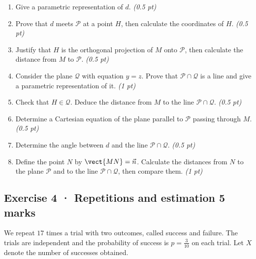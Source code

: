 \begin{enumerate}

\item Give a parametric representation of $d$. \hfill\textit{(0.5 pt)}

\item Prove that $d$ meets $\mathcal P$ at a point $H$, then calculate the coordinates of $H$. \hfill\textit{(0.5 pt)}

\item Justify that $H$ is the orthogonal projection of $M$ onto $\mathcal P$, then calculate the distance from $M$ to $\mathcal P$. \hfill\textit{(0.5 pt)}

\item Consider the plane $\mathcal Q$ with equation $y=z$. Prove that $\mathcal P\cap\mathcal Q$ is a line and give a parametric representation of it. \hfill\textit{(1 pt)}

\item Check that $H\in\mathcal Q$. Deduce the distance from $M$ to the line $\mathcal P\cap\mathcal Q$. \hfill\textit{(0.5 pt)}

\item Determine a Cartesian equation of the plane parallel to $\mathcal P$ passing through $M$. \hfill\textit{(0.5 pt)}

\item Determine the angle between $d$ and the line $\mathcal P\cap\mathcal Q$. \hfill\textit{(0.5 pt)}

\item Define the point $N$ by $\vect{MN}=\vec n$. Calculate the distances from $N$ to the plane $\mathcal P$ and to the line $\mathcal P\cap\mathcal Q$, then compare them. \hfill\textit{(1 pt)}

\end{enumerate}

\subsection*{Exercise 4 · Repetitions and estimation \hfill 5 marks}We repeat $17$ times a trial with two outcomes, called success and failure. The trials are independent and the probability of success is $p=\frac{3}{10}$ on each trial. Let $X$ denote the number of successes obtained.

